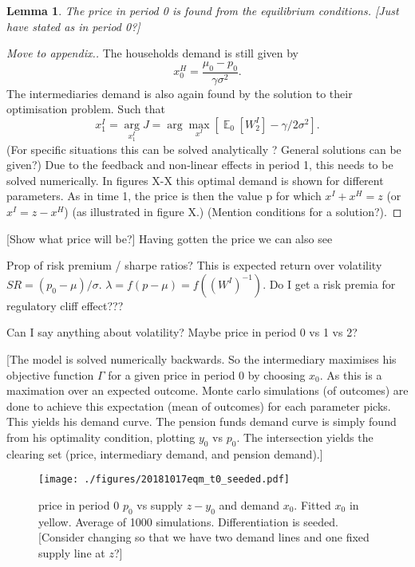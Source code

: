 \documentclass[11pt]{article}
\DeclareMathOperator{\E}{\mathbb{E}} %
\newtheorem{lemma}{Lemma}%
\begin{document}
\begin{lemma}
The price in period 0 is found from the equilibrium conditions. [Just have stated as in period 0?]
\end{lemma}
\begin{proof}
[Move to appendix.]
The households demand is still given by
\begin{equation}
x^H_0 = \frac{\mu_0-p_0}{\gamma \sigma^2}.
\end{equation}
The intermediaries demand is also again found by the solution to their optimisation problem. Such that
\begin{equation}
x^{I}_1 = \underset{x^{I}_1}{\arg} J = \arg \max_{x^I}\left[\E_0[W^I_2] - \gamma/2\sigma^2\right].
\end{equation}
(For specific situations this can be solved analytically ? General solutions can be given?) Due to the feedback and non-linear effects in period 1, this needs to be solved numerically. In figures X-X this optimal demand is shown for different parameters.
As in time 1, the price is then the value p for which $x^I+x^H = z$ (or$x^I= z - x^H $)  (as illustrated in figure X.) (Mention conditions for a solution?).
\end{proof}

[Show what price will be?] Having gotten the price we can also see

Prop of risk premium / sharpe ratios? This is expected return over volatility $SR = (p_0 - \mu)/ \sigma$. $\lambda = f(p-\mu) = f((W^I)^{-1})$. Do I get a risk premia for regulatory cliff effect???

Can I say anything about volatility? Maybe price in period 0 vs 1 vs 2?

[The model is solved numerically backwards. So the intermediary maximises his objective function $\Gamma$ for a given price in period 0 by choosing $x_0$. As this is a maximation over an expected outcome. Monte carlo simulations (of outcomes) are done to achieve this expectation (mean of outcomes) for each parameter picks. This yields his demand curve. The pension funds demand curve is simply found from his optimality condition, plotting $y_0$ vs $p_0$. The intersection yields the clearing set (price, intermediary demand, and pension demand).]

\begin{figure}[h]
\centering
\texttt{[image: ./figures/20181017eqm\_t0\_seeded.pdf]}
\caption{price in period 0 $p_0$ vs supply $z-y_0$ and demand $x_0$. Fitted $x_0$ in yellow. Average of 1000 simulations. Differentiation is seeded. [Consider changing so that we have two demand lines and one fixed supply line at $z$?]}
\end{figure}
\end{document}
